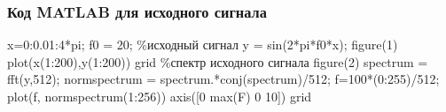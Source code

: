 \documentclass[10pt,a4paper]{article}
\begin{document}
\subsubsection{Код MATLAB для исходного сигнала}
x=0:0.01:4*pi;\newline
f0 = 20;\newline
\%исходный сигнал\newline
y = sin(2*pi*f0*x);\newline
figure(1)\newline
plot(x(1:200),y(1:200))\newline
grid\newline
\%спектр исходного сигнала\newline
figure(2)\newline
spectrum = fft(y,512);\newline
normspectrum = spectrum.*conj(spectrum)/512;\newline
f=100*(0:255)/512;\newline
plot(f, normspectrum(1:256))\newline
axis([0 max(F) 0 10])\newline
grid\newline
\end{document}

